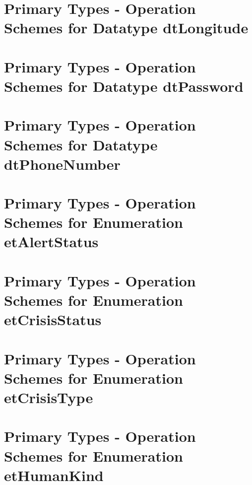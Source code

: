\section{Primary Types - Operation Schemes for Datatype dtLongitude} 
\label{OM-CM-PTDataType-dtLongitude}

\section{Primary Types - Operation Schemes for Datatype dtPassword} 
\label{OM-CM-PTDataType-dtPassword}

\section{Primary Types - Operation Schemes for Datatype dtPhoneNumber} 
\label{OM-CM-PTDataType-dtPhoneNumber}





\section{Primary Types - Operation Schemes for Enumeration etAlertStatus} 
\label{OM-CM-PTEnumType-etAlertStatus}

\section{Primary Types - Operation Schemes for Enumeration etCrisisStatus} 
\label{OM-CM-PTEnumType-etCrisisStatus}

\section{Primary Types - Operation Schemes for Enumeration etCrisisType} 
\label{OM-CM-PTEnumType-etCrisisType}

\section{Primary Types - Operation Schemes for Enumeration etHumanKind} 
\label{OM-CM-PTEnumType-etHumanKind}




